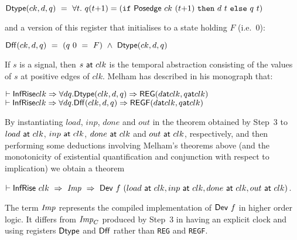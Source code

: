 \vspace*{2mm}

$\mathsf{Dtype}(ck,d,q) ~=~ \forall t.~q(t{+}1) = (\texttt{if}~\mathsf{Posedge}~ck~(t{+}1)~\texttt{then}~d~t~\texttt{else}~q~t)$

\vspace*{2mm}

\noindent and a version of this register that initialises to a state holding $F$ (i.e.~$0$):

\vspace*{2mm}

$\mathsf{Dff}(ck,d,q) ~ = ~ (q~0~ =~F)~\wedge~\mathsf{Dtype}(ck,d,q)$

\vspace*{2mm}

If $s$ is a signal, then $s~\mathsf{at}~clk$ is the temporal
abstraction consisting of the values of $s$ at positive edges of
$clk$. 
Melham has described in his monograph that:




{\baselineskip14pt\begin{alltt}
\( \vdash \DEF{InfRise} clk \Rightarrow {\forall}d q. \DEF{Dtype}(clk,d,q) \Rightarrow \DEF{REG}(d \DEF{at} clk, q \DEF{at} clk) \)
\( \vdash \DEF{InfRise} clk \Rightarrow {\forall}d q. \DEF{Dff}(clk,d,q) \Rightarrow \DEF{REGF}(d \DEF{at} clk, q \DEF{at} clk)  \)
\end{alltt}}



By instantiating $load$, $inp$, $done$ and $out$ in the theorem
obtained by Step~3 to $load~\mathsf{at}~clk$, $inp~\mathsf{at}~clk$,
$done~\mathsf{at}~clk$ and $out~\mathsf{at}~clk$, respectively, and then
performing some deductions involving Melham's theorems above (and the
monotonicity of existential quantification and conjunction with
respect to implication) we obtain a theorem

\vspace*{2mm}

$\vdash \mathsf{InfRise}~clk~\Rightarrow~{\it{Imp}}~\Rightarrow~\mathsf{Dev}~f~(load~\mathsf{at}~clk,inp~\mathsf{at}~clk,done~\mathsf{at}~clk,out~\mathsf{at}~clk)$.

\vspace*{2mm}

The term ${\it{Imp}}$ represents the compiled implementation of $\mathsf{Dev}~f$ in higher order logic.
It differs from ${\it{Imp}}_C$ produced by Step~3 in having an explicit clock and using
registers $\mathsf{Dtype}$ and $\mathsf{Dff}$ rather than \texttt{REG} and \texttt{REGF}.

